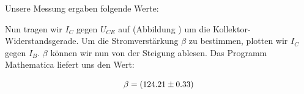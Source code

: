 \newpage
Unsere Messung ergaben folgende Werte:\\

\begin{center}

\end{center}

Nun tragen wir \(I_C\) gegen \(U_{CE}\) auf (Abbildung ) um die Kollektor-Widerstandsgerade. Um die Stromverstärkung \(\beta\) zu bestimmen, plotten wir \(I_C\)gegen \(I_B\). \(\beta\) können wir nun von der Steigung ablesen. Das Programm Mathematica liefert uns den Wert:

\begin{equation}
\notag
\beta= (124.21\pm 0.33) 
\end{equation}


\begin{center}
\begin{minipage}{\linewidth}
\centering
{}
%
\label{transistor}
\end{minipage}
\end{center}

\begin{center}
\begin{minipage}{\linewidth}
\centering
{}
%
\label{transistor}
\end{minipage}
\end{center}

